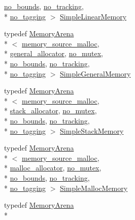 \begin{DoxyCompactItemize}
\hyperlink{structcrap_1_1no__bounds}{no\+\_\+bounds}, \hyperlink{structcrap_1_1no__tracking}{no\+\_\+tracking}, \\*
\hyperlink{structcrap_1_1no__tagging}{no\+\_\+tagging} $>$ \hyperlink{namespacecrap_a15a43bda87dfd4f909e30e1df3b1cee7}{Simple\+Linear\+Memory}
\item 
typedef \hyperlink{classcrap_1_1_memory_arena}{Memory\+Arena}\\*
$<$ \hyperlink{classcrap_1_1memory__source__malloc}{memory\+\_\+source\+\_\+malloc}, \\*
\hyperlink{classcrap_1_1general__allocator}{general\+\_\+allocator}, \hyperlink{structcrap_1_1no__mutex}{no\+\_\+mutex}, \\*
\hyperlink{structcrap_1_1no__bounds}{no\+\_\+bounds}, \hyperlink{structcrap_1_1no__tracking}{no\+\_\+tracking}, \\*
\hyperlink{structcrap_1_1no__tagging}{no\+\_\+tagging} $>$ \hyperlink{namespacecrap_a0f685df0fdfec9a4cbf9aaeab41a73a5}{Simple\+General\+Memory}
\item 
typedef \hyperlink{classcrap_1_1_memory_arena}{Memory\+Arena}\\*
$<$ \hyperlink{classcrap_1_1memory__source__malloc}{memory\+\_\+source\+\_\+malloc}, \\*
\hyperlink{classcrap_1_1stack__allocator}{stack\+\_\+allocator}, \hyperlink{structcrap_1_1no__mutex}{no\+\_\+mutex}, \\*
\hyperlink{structcrap_1_1no__bounds}{no\+\_\+bounds}, \hyperlink{structcrap_1_1no__tracking}{no\+\_\+tracking}, \\*
\hyperlink{structcrap_1_1no__tagging}{no\+\_\+tagging} $>$ \hyperlink{namespacecrap_a1265b2d1470f9e9196ec1ffcb2fd0701}{Simple\+Stack\+Memory}
\item 
typedef \hyperlink{classcrap_1_1_memory_arena}{Memory\+Arena}\\*
$<$ \hyperlink{classcrap_1_1memory__source__malloc}{memory\+\_\+source\+\_\+malloc}, \\*
\hyperlink{classcrap_1_1malloc__allocator}{malloc\+\_\+allocator}, \hyperlink{structcrap_1_1no__mutex}{no\+\_\+mutex}, \\*
\hyperlink{structcrap_1_1no__bounds}{no\+\_\+bounds}, \hyperlink{structcrap_1_1no__tracking}{no\+\_\+tracking}, \\*
\hyperlink{structcrap_1_1no__tagging}{no\+\_\+tagging} $>$ \hyperlink{namespacecrap_a8711640793bf2ed760185fe66c8e3d03}{Simple\+Malloc\+Memory}
\item 
typedef \hyperlink{classcrap_1_1_memory_arena}{Memory\+Arena}\\*

\end{DoxyCompactItemize}
